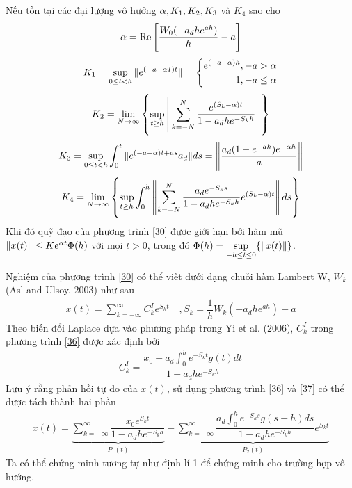 \begin{hq}
	Nếu tồn tại các đại lượng vô hướng $\alpha, K_1, K_2, K_3$ và $K_4$ sao cho
	\begin{align}\label{31}
		\alpha = \mathrm{Re} \left[ \dfrac{W_0(-a_dhe^{ah})}{h} - a\right]
	\end{align}
\begin{align}\label{32}
	K_1 = \sup \limits_{0 \le t <h} \Vert e^{(-a - \alpha I)t} \Vert 
	= \left\{\begin{aligned} e^{(-a-\alpha)h}, -a > \alpha\\1, -a \le \alpha\end{aligned}\right.
\end{align}
\begin{align}\label{33}
	K_2 = \lim\limits_{N \to \infty} \left\{ \sup \limits_{t \ge h}\left \Vert \sum_{k=-N}^N \dfrac{e^{(S_k-\alpha)t}}{1-a_dhe^{-S_kh}} \right \Vert\right\}
\end{align}
\begin{align}\label{34}
	K_3 = \sup\limits_{0 \le t <h}\int_0^t \Vert e^{(-a - \alpha)t + as }a_d\Vert ds  = \left \Vert \dfrac{a_d(1-e^{-ah})e^{-\alpha h}}{a}\right \Vert
\end{align}
\begin{align}\label{35}
	K_4= \lim\limits_{N\to \infty} \left\{\sup\limits_{t \ge h} \int_0^h\left\Vert \sum_{k=-N}^N \dfrac{a_de^{-S_ks }}{1-a_dhe^{-S_kh}}e^{(S_k-\alpha)t} \right\Vert ds  \right\}
\end{align}
Khi đó quỹ đạo của phương trình \eqref{30} được giới hạn bởi hàm mũ $\Vert x(t) \Vert \le K e^{\alpha t} \Phi (h)$ với mọi $t >0$, trong đó $\Phi(h) = \sup \limits_{-h \le t \le 0}\{ \Vert x(t)\Vert\}$.
\end{hq}
\begin{cm}
	Nghiệm của phương trình \eqref{30} có thể viết dưới dạng chuỗi hàm Lambert W, $W_k$ (Asl and Ulsoy, 2003) như sau
\begin{align}\label{36}
	x(t) = \sum_{k = -\infty}^{\infty} C^I_ke^{S_kt} \quad , S_k = \dfrac{1}{h}W_k(-a_dhe^{ah})-a
\end{align}	
Theo biến đổi Laplace dựa vào phương pháp trong Yi et al. (2006),  $C_k^I$ trong phương trình \eqref{36} được xác định bởi
\begin{align}\label{37}
	C_k^I = \dfrac{x_0 -a_d\int_{0}^{h}e^{-S_kt}g(t)dt}{1-a_dhe^{-S_kh}}
\end{align}
Lưu ý rằng phản hồi tự do của $x(t)$, sử dụng phương trình \eqref{36} và \eqref{37} có thể được tách thành hai phần
\begin{align}\label{38}
	x(t) = \underbrace{\sum_{k=-\infty}^{\infty} \dfrac{x_0e^{S_kt}}{1-a_dhe^{-S_kh}}}_{P_1(t)} - \underbrace{\sum_{k=-\infty}^{\infty} \dfrac{a_d\int_0^he^{-S_ks }g(s -h)ds }{1-a_dhe^{-S_kh}}e^{S_kt}}_{P_2(t)}
\end{align}
Ta có thể chứng minh tương tự như định lí 1 để chứng minh cho trường hợp vô hướng.
\end{cm}
